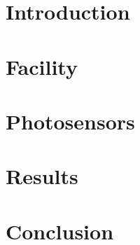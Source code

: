 \documentclass[final,5p,times,twocolumn,longtitle]{elsarticle-la}
\begin{document}

\maketitle



\section{Introduction}
\label{introduction} 

\section{Facility}
\label{facility}

\section{Photosensors}
\label{photosensors}

\section{Results}
\label{results}

\section{Conclusion}
\label{conclusion}














\end{document}
